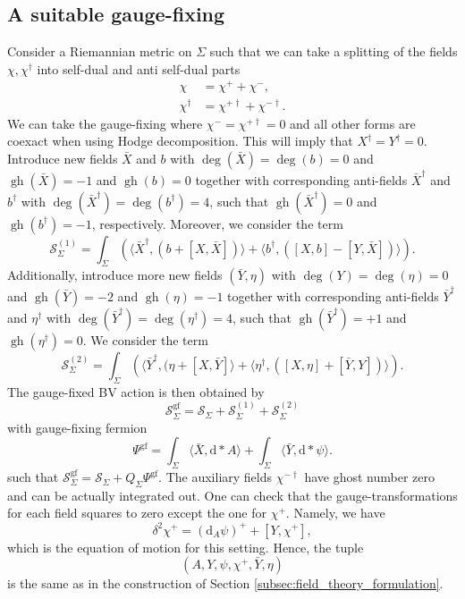 \documentclass[11pt,colorinlistoftodos]{amsart}
\numberwithin{equation}{subsection}
\theoremstyle{plain}
\theoremstyle{definition}
\theoremstyle{remark}
\newcommand{\dd}{{\mathrm{d}}}
\DeclareMathOperator{\gh}{gh}
\newcommand{\calS}{\mathcal{S}}
\begin{document}
\subsection{A suitable gauge-fixing}
\label{subsec:suitable_gauge_fixing}
Consider a Riemannian metric on $\Sigma$ such that we can take a splitting of the fields $\chi,\chi^\dagger$ into self-dual and anti self-dual parts
\begin{align}
    \chi&=\chi^++\chi^-,\\
    \chi^\dagger&=\chi^{+\dagger}+\chi^{-\dagger}.
\end{align}
We can take the gauge-fixing where $\chi^-=\chi^{+\dagger}=0$ and all other forms are coexact when using Hodge decomposition. This will imply that $X^\dagger=Y^\dagger=0$. Introduce new fields $\bar X$ and $b$ with $\deg(\bar X)=\deg(b)=0$ and $\gh(\bar X)=-1$ and $\gh(b)=0$ together with corresponding anti-fields $\bar X^\dagger$ and $b^\dagger$ with $\deg(\bar X^\dagger)=\deg(b^\dagger)=4$, such that $\gh(\bar X^\dagger)=0$ and $\gh(b^\dagger)=-1$, respectively. Moreover, we consider the term 
\[
\calS^{(1)}_\Sigma=\int_\Sigma\left(\langle \bar X^\dagger,(b+[X,\bar X])\rangle+\langle b^\dagger,([X,b]-[Y,\bar X])\rangle\right).
\]
Additionally, introduce more new fields $(\bar Y,\eta)$ with $\deg(Y)=\deg(\eta)=0$ and $\gh(\bar Y)=-2$ and $\gh(\eta)=-1$ together with corresponding anti-fields $\bar Y^\dagger$ and $\eta^\dagger$ with $\deg(\bar Y^\dagger)=\deg(\eta^\dagger)=4$, such that $\gh(\bar Y^\dagger)=+1$ and $\gh(\eta^\dagger)=0$. We consider the term 
\[
\calS^{(2)}_\Sigma=\int_\Sigma\left(\langle \bar Y^\dagger,(\eta+[X,\bar Y]\rangle+\langle \eta^\dagger,([X,\eta]+[\bar Y,Y])\rangle\right).
\]
The gauge-fixed BV action is then obtained by 
\[
\calS^\mathrm{gf}_\Sigma=\calS_\Sigma+\calS^{(1)}_\Sigma+\calS^{(2)}_\Sigma
\]
with gauge-fixing fermion
\begin{equation}
\label{eq:gauge-fixing_fermion}
\varPsi^\mathrm{gf}=\int_\Sigma\langle \bar X,\dd *A\rangle+\int_\Sigma\langle \bar Y,\dd*\psi\rangle.
\end{equation}
such that $\calS^\mathrm{gf}_\Sigma=\calS_\Sigma+Q_\Sigma\varPsi^\mathrm{gf}$.
The auxiliary fields $\chi^{-\dagger}$ have ghost number zero and can be actually integrated out. One can check that the gauge-transformations for each field squares to zero except the one for $\chi^+$. Namely, we have
\[
\delta^2\chi^+=(\dd_A\psi)^++[Y,\chi^+],
\]
which is the equation of motion for this setting. Hence, the tuple
\[
(A,Y,\psi,\chi^+,\bar Y,\eta)
\]
is the same as in the construction of Section \ref{subsec:field_theory_formulation}.
\end{document}

